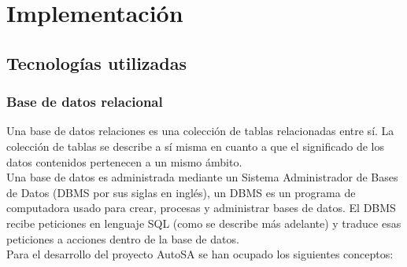 \chapter{Implementación}\label{cap4}

\section{Tecnologías utilizadas}
\subsection{Base de datos relacional}\label{sec-bd-r}
Una base de datos relaciones es una colección de tablas relacionadas entre sí. La colección de tablas se describe a sí misma en cuanto a que el significado de los datos contenidos pertenecen a un mismo ámbito\cite{DataBaseConcepts}.\\
Una base de datos es administrada mediante un Sistema Administrador de Bases de Datos (DBMS por sus siglas en inglés), un DBMS es un programa de computadora usado para crear, procesas y administrar bases de datos. El DBMS recibe peticiones en lenguaje SQL (como se describe más adelante) y traduce esas peticiones a acciones dentro de la base de datos\cite{DataBaseConcepts}.\\
Para el desarrollo del proyecto AutoSA se han ocupado los siguientes conceptos:
